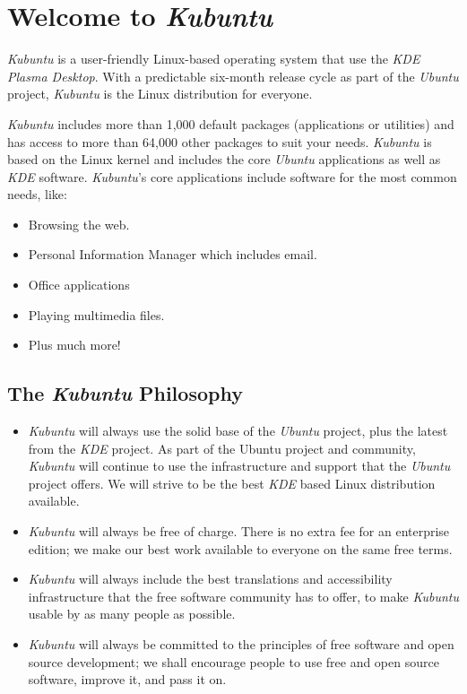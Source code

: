 \section{Welcome to \emph{Kubuntu}}\label{welcome-to-kubuntu}

\emph{Kubuntu} is a user-friendly Linux-based operating system that use
the \emph{KDE} \emph{Plasma Desktop}. With a predictable six-month
release cycle as part of the \emph{Ubuntu} project, \emph{Kubuntu} is
the Linux distribution for everyone.

\emph{Kubuntu} includes more than 1,000 default packages (applications
or utilities) and has access to more than 64,000 other packages to suit
your needs. \emph{Kubuntu} is based on the Linux kernel and includes the
core \emph{Ubuntu} applications as well as \emph{KDE} software.
\emph{Kubuntu}'s core applications include software for the most common
needs, like:

\begin{itemize}
\itemsep1pt\parskip0pt
\item
  Browsing the web.
\item
  Personal Information Manager which includes email.
\item
  Office applications
\item
  Playing multimedia files.
\item
  Plus much more!
\end{itemize}

\subsection{The \emph{Kubuntu} Philosophy}\label{the-kubuntu-philosophy}

\begin{itemize}
\itemsep1pt\parskip0pt
\item
  \emph{Kubuntu} will always use the solid base of the \emph{Ubuntu}
  project, plus the latest from the \emph{KDE} project. As part of the
  Ubuntu project and community, \emph{Kubuntu} will continue to use the
  infrastructure and support that the \emph{Ubuntu} project offers. We
  will strive to be the best \emph{KDE} based Linux distribution
  available.
\item
  \emph{Kubuntu} will always be free of charge. There is no extra fee
  for an enterprise edition; we make our best work available to everyone
  on the same free terms.
\item
  \emph{Kubuntu} will always include the best translations and
  accessibility infrastructure that the free software community has to
  offer, to make \emph{Kubuntu} usable by as many people as possible.
\item
  \emph{Kubuntu} will always be committed to the principles of free
  software and open source development; we shall encourage people to use
  free and open source software, improve it, and pass it on.
\end{itemize}

